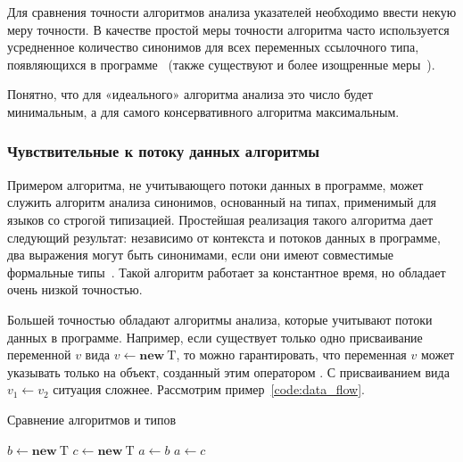 \documentclass[14pt,titlepage,draft]{extarticle}
\newcommand{\type}[1]{\mathrm{#1}}
\newcommand{\op}[1]{\mathbf{#1}}
\begin{document}
      Для сравнения точности алгоритмов анализа указателей необходимо ввести
      некую меру точности. В качестве простой меры точности алгоритма часто
      используется усредненное количество синонимов для всех переменных
      ссылочного типа, появляющихся в
      программе~\cite[раздел~3.2]{hind_pointer_analysis_not_solved_yet}
      (также существуют и более изощренные
      меры~\cite{hind_pointer_analysis_not_solved_yet,diwan_tbaa}).

      Понятно, что для «идеального» алгоритма анализа это число будет
      минимальным, а для самого консервативного алгоритма максимальным.

      \subsubsection{Чувствительные к потоку данных алгоритмы}
        \label{section:analysis_classification_data_flow}

        Примером алгоритма, не учитывающего потоки данных в программе, может
        служить алгоритм анализа синонимов, основанный на типах, применимый
        для языков со строгой типизацией.
        Простейшая реализация такого алгоритма дает следующий результат:
        независимо от контекста и потоков данных в программе, два выражения
        могут быть синонимами, если они имеют совместимые формальные
        типы~\cite[раздел~2.2]{diwan_tbaa}.
        Такой алгоритм работает за константное время, но обладает очень низкой
        точностью.

        Большей точностью обладают алгоритмы анализа, которые учитывают потоки
        данных в программе.
        Например, если существует только одно присваивание переменной $v$ вида
        $v \gets \op{new}~\type{T}$, то можно гарантировать, что переменная $v$
        может указывать только на объект, созданный этим оператором .
        С присваиванием вида $v_1 \gets v_2$ ситуация сложнее. Рассмотрим
        пример~\ref{code:data_flow}.

        \begin{algorithm}
          \caption{Сравнение алгоритмов  и
                                         типов}
          \label{code:data_flow}
          \begin{algorithmic}[1]
            \State $b \gets \op{new}~\type{T}$
            \State $c \gets \op{new}~\type{T}$
            \State $a \gets b$
            \State $a \gets c$
          \end{algorithmic}
        \end{algorithm}
\end{document}
